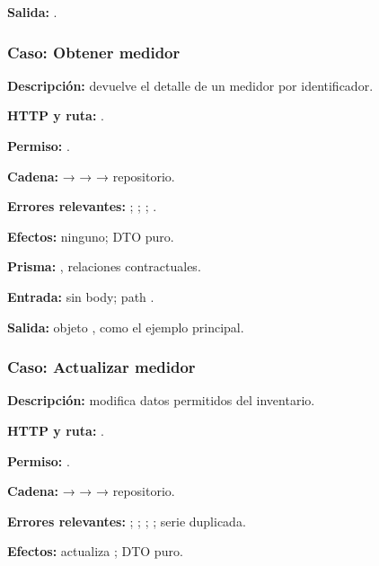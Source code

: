 \textbf{Salida:} \texttt{}.


\subsubsection{Caso: Obtener medidor}


\textbf{Descripción:} devuelve el detalle de un medidor por identificador.  

\textbf{HTTP y ruta:} \texttt{}.  

\textbf{Permiso:} \texttt{}.  

\textbf{Cadena:} \texttt{} → \texttt{} → \texttt{} → repositorio.  

\textbf{Errores relevantes:} \texttt{}; \texttt{}; \texttt{}; \texttt{}.  

\textbf{Efectos:} ninguno; DTO puro.  

\textbf{Prisma:} \texttt{}, relaciones contractuales.  

\textbf{Entrada:} sin body; path \texttt{}.  

\textbf{Salida:} objeto \texttt{}, como el ejemplo principal.


\subsubsection{Caso: Actualizar medidor}


\textbf{Descripción:} modifica datos permitidos del inventario.  

\textbf{HTTP y ruta:} \texttt{}.  

\textbf{Permiso:} \texttt{}.  

\textbf{Cadena:} \texttt{} → \texttt{} → \texttt{} → repositorio.  

\textbf{Errores relevantes:} \texttt{}; \texttt{}; \texttt{}; \texttt{}; \texttt{} serie duplicada.  

\textbf{Efectos:} actualiza \texttt{}; DTO puro.  

